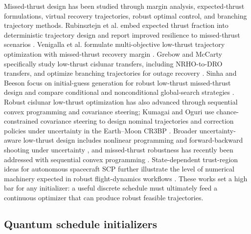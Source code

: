 \documentclass[preprint,12pt]{elsarticle}
\begin{document}
Missed-thrust design has been studied through margin analysis, expected-thrust formulations, virtual recovery trajectories, robust optimal control, and branching trajectory methods. Rubinsztejn et al. embed expected thrust fraction into deterministic trajectory design and report improved resilience to missed-thrust scenarios \cite{rubinsztejn2021expected}. Venigalla et al. formulate multi-objective low-thrust trajectory optimization with missed-thrust recovery margin \cite{venigalla2022multi}. Grebow and McCarty specifically study low-thrust cislunar transfers, including NRHO-to-DRO transfers, and optimize branching trajectories for outage recovery \cite{grebow2020missed}. Sinha and Beeson focus on initial-guess generation for robust low-thrust missed-thrust design and compare conditional and nonconditional global-search strategies \cite{sinha2025initial}. Robust cislunar low-thrust optimization has also advanced through sequential convex programming and covariance steering; Kumagai and Oguri use chance-constrained covariance steering to design nominal trajectories and correction policies under uncertainty in the Earth--Moon CR3BP \cite{kumagai2025robust}. Broader uncertainty-aware low-thrust design includes nonlinear programming and forward-backward shooting under uncertainty \cite{varghese2026uncertainty}, and missed-thrust robustness has recently been addressed with sequential convex programming \cite{sekine2026missedscp}. State-dependent trust-region ideas for autonomous spacecraft SCP further illustrate the level of numerical machinery expected in robust flight-dynamics workflows \cite{bernardini2024trust}. These works set a high bar for any initializer: a useful discrete schedule must ultimately feed a continuous optimizer that can produce robust feasible trajectories.

\subsection{Quantum schedule initializers}
\end{document}

